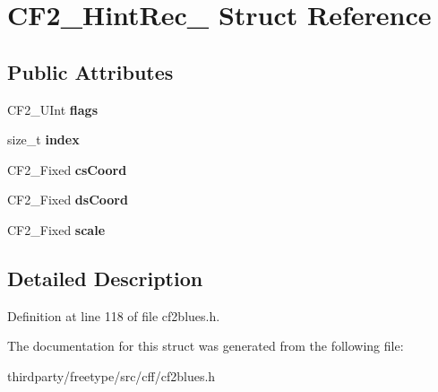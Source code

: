 \hypertarget{struct_c_f2___hint_rec__}{}\section{C\+F2\+\_\+\+Hint\+Rec\+\_\+ Struct Reference}
\label{struct_c_f2___hint_rec__}
\subsection*{Public Attributes}
\begin{DoxyCompactItemize}
\item 
\mbox{\label{struct_c_f2___hint_rec___ae0e657cd0bd47c45a27064c31c46f3f8}} 
C\+F2\+\_\+\+U\+Int {\bfseries flags}
\item 
\mbox{\label{struct_c_f2___hint_rec___a31ccf1531e554603c46adeb03617aa2d}} 
size\+\_\+t {\bfseries index}
\item 
\mbox{\label{struct_c_f2___hint_rec___ab330bb459b6c358dd2f9c3b703bfd1fa}} 
C\+F2\+\_\+\+Fixed {\bfseries cs\+Coord}
\item 
\mbox{\label{struct_c_f2___hint_rec___ae20696d8ca1279d25dbda1cde8635fb7}} 
C\+F2\+\_\+\+Fixed {\bfseries ds\+Coord}
\item 
\mbox{\label{struct_c_f2___hint_rec___a017bb4cc4d88980dc68aa62d9a5edbec}} 
C\+F2\+\_\+\+Fixed {\bfseries scale}
\end{DoxyCompactItemize}


\subsection{Detailed Description}


Definition at line 118 of file cf2blues.\+h.



The documentation for this struct was generated from the following file\+:\begin{DoxyCompactItemize}
\item 
thirdparty/freetype/src/cff/cf2blues.\+h\end{DoxyCompactItemize}
